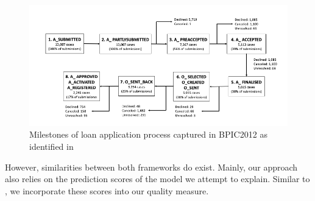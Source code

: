 \documentclass[./../../paper.tex]{subfiles}
\begin{document}
\begin{figure}[htbp]
    \centering
    \includegraphics[width=\textwidth]{figures/milestones.png}
    \caption{Milestones of loan application process captured in BPIC2012 as
    identified in \cite{bautista_ProcessMiningDrivenOptimization_2012}}
    \label{fig:milestones}
\end{figure}

However, similarities between both frameworks do exist. Mainly, our approach also relies on the prediction scores of the model we attempt to explain. Similar to \citeauthor{hsieh_DiCE4ELInterpretingProcess_2021}, we incorporate these scores into our quality measure. 

\end{document}
